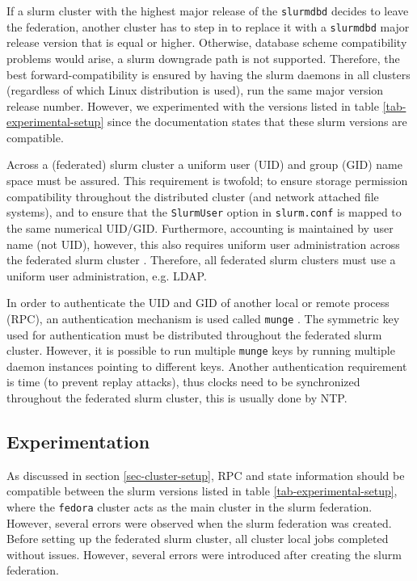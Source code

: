\documentclass[conference]{IEEEtran}
\begin{document}
If a \gls{slurm} cluster with the highest major release of the \texttt{slurmdbd} decides to leave the federation, another cluster has to step in to replace it with a \texttt{slurmdbd} major release version that is equal or higher. Otherwise, database scheme compatibility problems would arise, a \gls{slurm} downgrade path is not supported. Therefore, the best forward-compatibility is ensured by having the \gls{slurm} daemons in all clusters (regardless of which Linux distribution is used), run the same major version release number. However, we experimented with the versions listed in table \ref{tab-experimental-setup} since the documentation states that these \gls{slurm} versions are compatible.

Across a (federated) \gls{slurm} cluster a uniform user (UID) and group (GID) name space must be assured. This requirement is twofold; to ensure storage permission compatibility throughout the distributed cluster (and network attached file systems), and to ensure that the \texttt{SlurmUser} option in \texttt{slurm.conf} is mapped to the same numerical UID/GID. Furthermore, accounting is maintained by user name (not UID), however, this also requires uniform user administration across the federated \gls{slurm} cluster \cite{slurm-accounting}. Therefore, all federated \gls{slurm} clusters must use a uniform user administration, e.g. LDAP.

In order to authenticate the UID and GID of another local or remote process (RPC), an authentication mechanism is used called \texttt{munge} \cite{github-munge}. The symmetric key used for authentication must be distributed throughout the federated \gls{slurm} cluster. However, it is possible to run multiple \texttt{munge} keys by running multiple daemon instances pointing to different keys. Another authentication requirement is time (to prevent replay attacks), thus clocks need to be synchronized throughout the federated \gls{slurm} cluster, this is usually done by NTP.


\subsection{Experimentation}
\label{sec-experimentation}
As discussed in section \ref{sec-cluster-setup}, RPC and state information should be compatible between the \gls{slurm} versions listed in table \ref{tab-experimental-setup}, where the \texttt{fedora} cluster acts as the main cluster in the \gls{slurm} federation. However, several errors were observed when the \gls{slurm} federation was created. Before setting up the federated \gls{slurm} cluster, all cluster local jobs completed without issues. However, several errors were introduced after creating the \gls{slurm} federation.
\end{document}
